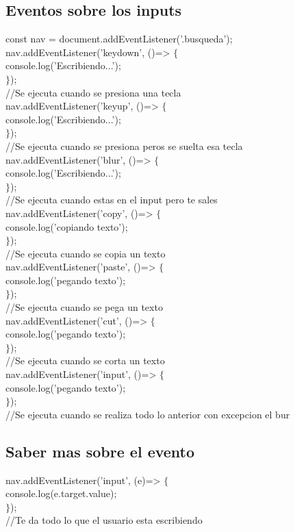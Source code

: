 \documentclass[10pt,a4paper]{article}
\begin{document}
\subsection{Eventos sobre los inputs}
const nav = document.addEventListener('.busqueda'); \\
nav.addEventListener('keydown', ()=> $ \{ $ \\ 
console.log('Escribiendo...');  \\
$ \} $); \\
//Se ejecuta cuando se presiona una tecla \\
nav.addEventListener('keyup', ()=> $ \{ $ \\ 
console.log('Escribiendo...');  \\
$ \} $); \\
//Se ejecuta cuando se presiona peros se suelta esa tecla \\
nav.addEventListener('blur', ()=> $ \{ $ \\ 
console.log('Escribiendo...');  \\
$ \} $); \\
//Se ejecuta cuando estas en el input pero te sales \\
nav.addEventListener('copy', ()=> $ \{ $ \\ 
console.log('copiando texto');  \\
$ \} $); \\
//Se ejecuta cuando se copia un texto \\
nav.addEventListener('paste', ()=> $ \{ $ \\ 
console.log('pegando texto');  \\
$ \} $); \\
//Se ejecuta cuando se pega un texto \\
nav.addEventListener('cut', ()=> $ \{ $ \\ 
console.log('pegando texto');  \\
$ \} $); \\
//Se ejecuta cuando se corta un texto \\
nav.addEventListener('input', ()=> $ \{ $ \\ 
console.log('pegando texto');  \\
$ \} $); \\
//Se ejecuta cuando se realiza todo lo anterior con excepcion el bur\\
\subsection{Saber mas sobre el evento}
nav.addEventListener('input', (e)=> $ \{ $ \\ 
console.log(e.target.value);  \\
$ \} $); \\
//Te da todo lo que el usuario esta escribiendo\\
\end{document}
